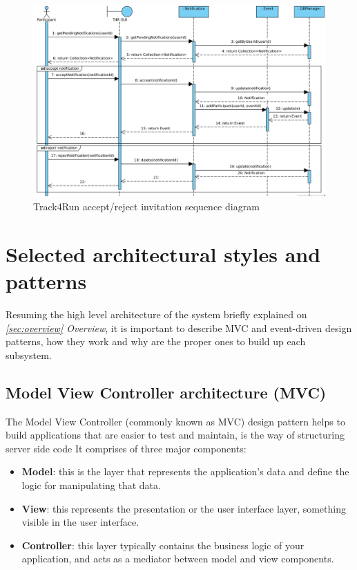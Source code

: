 \documentclass[a4paper, hidelinks, 12pt]{report}
\begin{document}
\begin{itemize}
	\begin{figure}[H]
		\centering
		\includegraphics[width=1\textwidth]{diagrams/sequence_diagrams/t4r_accept_reject_notification.png}
		\caption[Track4Run accept/reject invitation sequence diagram]{Track4Run accept/reject invitation sequence diagram}
		\label{fig:t4r_seq_accept_invitation}
	\end{figure}	
	
	\end{itemize}
	
	\section{Selected architectural styles and patterns}
Resuming the high level architecture of the system briefly explained on \textit{ \autoref{sec:overview} Overview}, it is important to describe MVC	and event-driven design patterns, how they work and why are the proper ones to build up each subsystem.

	\subsection{Model View Controller architecture (MVC)}
	The Model View Controller (commonly known as MVC) design pattern helps  to build applications that are easier to test and maintain, is the way of structuring server side code 
	It comprises of three major components:
	
	\begin{itemize}
	\item {\textbf{Model}}: this is the layer that represents the application's data and define the logic for manipulating that data.
	\item {\textbf{View}}: this represents the presentation or the user interface layer, something visible in the user interface.
	\item{\textbf{Controller}}: this layer typically contains the business logic of your application, and acts as a mediator between model and view components.
	\end{itemize}
\end{document}
